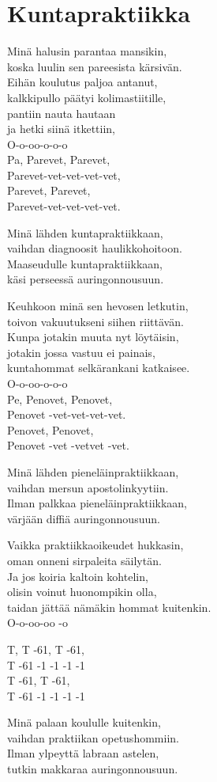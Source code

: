 \section{Kuntapraktiikka}
Minä halusin parantaa mansikin,\\
koska luulin sen pareesista kärsivän.\\
Eihän koulutus paljoa antanut,\\
kalkkipullo päätyi kolimastiitille,\\
pantiin nauta hautaan\\
ja hetki siinä itkettiin,\\
O-o-oo-o-o-o\\
Pa, Parevet, Parevet,\\
Parevet-vet-vet-vet-vet,\\
Parevet, Parevet,\\
Parevet-vet-vet-vet-vet.

Minä lähden kuntapraktiikkaan,\\
vaihdan diagnoosit haulikkohoitoon.\\
Maaseudulle kuntapraktiikkaan,\\
käsi perseessä auringonnousuun.

Keuhkoon minä sen hevosen letkutin,\\
toivon vakuutukseni siihen riittävän.\\
Kunpa jotakin muuta nyt löytäisin,\\
jotakin jossa vastuu ei painais,\\
kuntahommat selkärankani katkaisee.\\
O-o-oo-o-o-o\\
Pe, Penovet, Penovet,\\
Penovet -vet-vet-vet-vet.\\
Penovet, Penovet,\\
Penovet -vet -vetvet -vet.

Minä lähden pieneläinpraktiikkaan,\\
vaihdan mersun apostolinkyytiin.\\
Ilman palkkaa pieneläinpraktiikkaan,\\
värjään diffiä auringonnousuun.

Vaikka praktiikkaoikeudet hukkasin,\\
oman onneni sirpaleita säilytän.\\
Ja jos koiria kaltoin kohtelin,\\
olisin voinut huonompikin olla,\\
taidan jättää nämäkin hommat kuitenkin.\\
O-o-oo-oo -o

T, T -61, T -61,\\
T -61 -1 -1 -1 -1\\
T -61, T -61,\\
T -61 -1 -1 -1 -1

Minä palaan koululle kuitenkin,\\
vaihdan praktiikan opetushommiin.\\
Ilman ylpeyttä labraan astelen,\\
tutkin makkaraa auringonnousuun.